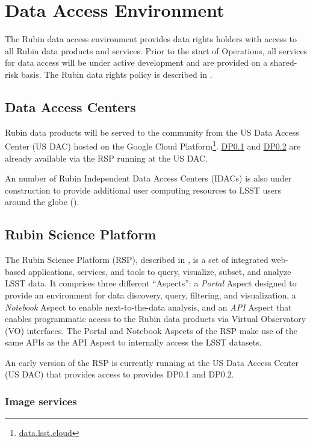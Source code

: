\section{Data Access Environment} \label{access}

The Rubin data access environment provides data rights holders with access to all Rubin data products and services. 
Prior to the start of Operations, all services for data access will be under active development and are provided on a shared-risk basis. 
The Rubin data rights policy is described in .

\subsection{Data Access Centers}

Rubin data products will be served to the community from the US Data Access Center (US DAC) hosted on the Google Cloud Platform\footnote{\url{data.lsst.cloud}}.
\hyperref[sec:dp01]{DP0.1} and \hyperref[sec:dp02]{DP0.2}  are already available via the RSP running at the US DAC.

An number of Rubin Independent Data Access Centers (IDACs) is also under construction to provide additional user computing resources to LSST users around the globe ().

\subsection{Rubin Science Platform}

The Rubin Science Platform (RSP), described in , is a set of integrated web-based applications, services, and tools to query, visualize, subset, and analyze LSST data.
It comprises three different ``Aspects'': a \emph{Portal} Aspect designed to provide an environment for data discovery, query, filtering, and visualization, a \emph{Notebook} Aspect to enable next-to-the-data analysis, and an \emph{API} Aspect that enables programmatic access to the Rubin data products via Virtual Observatory (VO) interfaces.
The Portal and Notebook Aspects of the RSP make use of the same APIs as the API Aspect to internally access the LSST datasets.

An early version of the RSP is currently running at the US Data Access Center (US DAC) that provides access to provides DP0.1 and DP0.2. 

\subsubsection{Image services}

